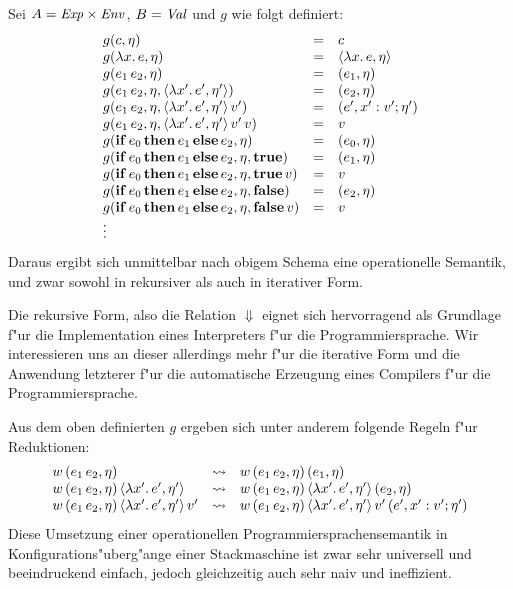 \documentclass[12pt,a4paper]{article}
\begin{document}
Sei $A = \mathit{Exp} \times \mathit{Env}$, $B = \mathit{Val}$ und $g$ wie folgt definiert:
\[\begin{array}{lcl}
  g(c,\eta) &=& c \\
  g(\lambda{x}.\,{e},\eta) &=& \langle{\lambda{x}.\,{e}},{\eta}\rangle \\
  g({e_1}\,{e_2},\eta) &=& (e_1,\eta) \\
  g({e_1}\,{e_2},\eta,\langle{\lambda{x'}.\,{e'}},{\eta'}\rangle) &=& (e_2,\eta) \\
  g({e_1}\,{e_2},\eta,\langle{\lambda{x'}.\,{e'}},{\eta'}\rangle\,v') &=& (e',x':v';\eta') \\
  g({e_1}\,{e_2},\eta,\langle{\lambda{x'}.\,{e'}},{\eta'}\rangle\,v'\,v) &=& v \\
  g(\mathbf{if}\,{e_0}\,\mathbf{then}\,{e_1}\,\mathbf{else}\,{e_2},\eta) &=& (e_0,\eta) \\
  g(\mathbf{if}\,{e_0}\,\mathbf{then}\,{e_1}\,\mathbf{else}\,{e_2},\eta,\mathbf{true}) &=& (e_1,\eta) \\
  g(\mathbf{if}\,{e_0}\,\mathbf{then}\,{e_1}\,\mathbf{else}\,{e_2},\eta,\mathbf{true}\,v) &=& v \\
  g(\mathbf{if}\,{e_0}\,\mathbf{then}\,{e_1}\,\mathbf{else}\,{e_2},\eta,\mathbf{false}) &=& (e_2,\eta) \\
  g(\mathbf{if}\,{e_0}\,\mathbf{then}\,{e_1}\,\mathbf{else}\,{e_2},\eta,\mathbf{false}\,v) &=& v \\
  \vdots \\
\end{array}\]
Daraus ergibt sich unmittelbar nach obigem Schema eine operationelle Semantik, und zwar
sowohl in rekursiver als auch in iterativer Form.

Die rekursive Form, also die Relation $\Downarrow$ eignet sich hervorragend als Grundlage
f"ur die Implementation eines Interpreters f"ur die Programmiersprache. Wir interessieren
uns an dieser allerdings mehr f"ur die iterative Form und die Anwendung letzterer f"ur
die automatische Erzeugung eines Compilers f"ur die Programmiersprache.

Aus dem oben definierten $g$ ergeben sich unter anderem folgende Regeln f"ur Reduktionen:
\[\begin{array}{lcl}
  w\,({e_1}\,{e_2},\eta)
  &\rightsquigarrow& w\,({e_1}\,{e_2},\eta)\,(e_1,\eta) \\
  w\,({e_1}\,{e_2},\eta)\,\langle{\lambda{x'}.\,{e'}},{\eta'}\rangle
  &\rightsquigarrow& w\,({e_1}\,{e_2},\eta)\,\langle{\lambda{x'}.\,{e'}},{\eta'}\rangle\,(e_2,\eta) \\
  w\,({e_1}\,{e_2},\eta)\,\langle{\lambda{x'}.\,{e'}},{\eta'}\rangle\,v'
  &\rightsquigarrow& w\,({e_1}\,{e_2},\eta)\,\langle{\lambda{x'}.\,{e'}},{\eta'}\rangle\,v'\,(e',x':v';\eta') \\
\end{array}\]
Diese Umsetzung einer operationellen Programmiersprachensemantik in Konfigurations"uberg"ange einer Stackmaschine
ist zwar sehr universell und beeindruckend einfach, jedoch gleichzeitig auch sehr naiv und ineffizient.
\end{document}
